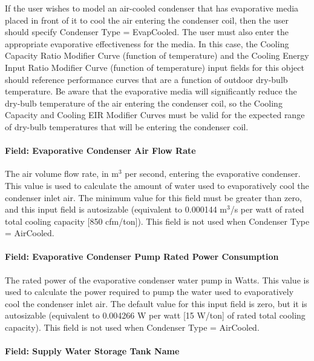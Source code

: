 If the user wishes to model an air-cooled condenser that has evaporative media placed in front of it to cool the air entering the condenser coil, then the user should specify Condenser Type = EvapCooled. The user must also enter the appropriate evaporative effectiveness for the media. In this case, the Cooling Capacity Ratio Modifier Curve (function of temperature) and the Cooling Energy Input Ratio Modifier Curve (function of temperature) input fields for this object should reference performance curves that are a function of outdoor dry-bulb temperature. Be aware that the evaporative media will significantly reduce the dry-bulb temperature of the air entering the condenser coil, so the Cooling Capacity and Cooling EIR Modifier Curves must be valid for the expected range of dry-bulb temperatures that will be entering the condenser coil.

\paragraph{Field: Evaporative Condenser Air Flow Rate}\label{field-evaporative-condenser-air-flow-rate-002}

The air volume flow rate, in m\(^{3}\) per second, entering the evaporative condenser. This value is used to calculate the amount of water used to evaporatively cool the condenser inlet air. The minimum value for this field must be greater than zero, and this input field is autosizable (equivalent to 0.000144 m\(^{3}\)/s per watt of rated total cooling capacity {[}850 cfm/ton{]}). This field is not used when Condenser Type = AirCooled.

\paragraph{Field: Evaporative Condenser Pump Rated Power Consumption}\label{field-evaporative-condenser-pump-rated-power-consumption-001}

The rated power of the evaporative condenser water pump in Watts. This value is used to calculate the power required to pump the water used to evaporatively cool the condenser inlet air. The default value for this input field is zero, but it is autosizable (equivalent to 0.004266 W per watt {[}15 W/ton{]} of rated total cooling capacity). This field is not used when Condenser Type = AirCooled.

\paragraph{Field: Supply Water Storage Tank Name}\label{field-supply-water-storage-tank-name-001}

